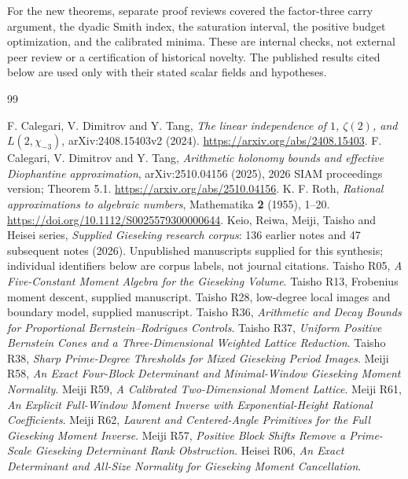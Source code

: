 \documentclass[11pt,a4paper]{article}
\numberwithin{equation}{section}
\theoremstyle{definition}\newtheorem{definition}[theorem]{Definition}
\theoremstyle{remark}\newtheorem{remark}[theorem]{Remark}
\begin{document}
For the new theorems, separate proof reviews covered the factor-three carry
argument, the dyadic Smith index, the saturation interval, the positive
budget optimization, and the calibrated minima. These are internal checks,
not external peer review or a certification of historical novelty.
The published results cited below are used only with their stated scalar
fields and hypotheses.

\begin{thebibliography}{99}\small\raggedright
{} F. Calegari, V. Dimitrov and Y. Tang,
\emph{The linear independence of $1$, $\zeta(2)$, and $L(2,\chi_{-3})$},
arXiv:2408.15403v2 (2024). \url{https://arxiv.org/abs/2408.15403}.
 F. Calegari, V. Dimitrov and Y. Tang,
\emph{Arithmetic holonomy bounds and effective Diophantine approximation},
arXiv:2510.04156 (2025), 2026 SIAM proceedings version; Theorem 5.1.
\url{https://arxiv.org/abs/2510.04156}.
 K. F. Roth, \emph{Rational approximations to algebraic numbers},
Mathematika \textbf{2} (1955), 1--20.
\url{https://doi.org/10.1112/S0025579300000644}.
 Keio, Reiwa, Meiji, Taisho and Heisei series,
\emph{Supplied Gieseking research corpus}: 136 earlier notes and 47 subsequent
notes (2026). Unpublished manuscripts supplied for this synthesis; individual
identifiers below are corpus labels, not journal citations.
 Taisho R05, \emph{A Five-Constant Moment Algebra for the Gieseking Volume}.
 Taisho R13, Frobenius moment descent, supplied manuscript.
 Taisho R28, low-degree local images and boundary model, supplied manuscript.
 Taisho R36, \emph{Arithmetic and Decay Bounds for Proportional Bernstein--Rodrigues Controls}.
 Taisho R37, \emph{Uniform Positive Bernstein Cones and a Three-Dimensional Weighted Lattice Reduction}.
 Taisho R38, \emph{Sharp Prime-Degree Thresholds for Mixed Gieseking Period Images}.
 Meiji R58, \emph{An Exact Four-Block Determinant and Minimal-Window Gieseking Moment Normality}.
 Meiji R59, \emph{A Calibrated Two-Dimensional Moment Lattice}.
 Meiji R61, \emph{An Explicit Full-Window Moment Inverse with Exponential-Height Rational Coefficients}.
 Meiji R62, \emph{Laurent and Centered-Angle Primitives for the Full Gieseking Moment Inverse}.
 Meiji R57, \emph{Positive Block Shifts Remove a Prime-Scale Gieseking Determinant Rank Obstruction}.
 Heisei R06, \emph{An Exact Determinant and All-Size Normality for Gieseking Moment Cancellation}.

\end{thebibliography}
\end{document}
